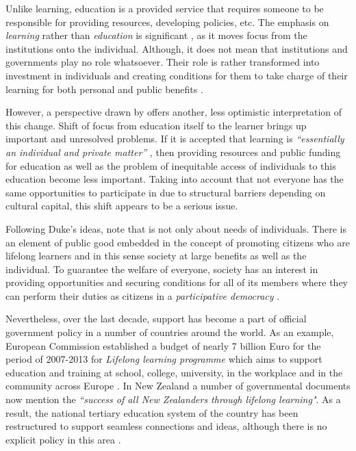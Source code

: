 Unlike learning, education is a provided service \citep{Boshier2000} that
requires someone to be responsible for providing resources, developing policies,
etc. The emphasis on \textit{learning} rather than \textit{education} is
significant \citep{Tuijnman2002}, as it moves focus from the institutions onto
the individual. Although, it does not mean that institutions and governments
play no role whatsoever. Their role is rather transformed into investment in
individuals and creating conditions for them to take charge of their learning
for both personal and public benefits \citep{Chen2009}.

However, a perspective drawn by \citet{Duke2001} offers another, less optimistic
interpretation of this change. Shift of focus from education itself to the
learner brings up important and unresolved problems. If it is accepted that
learning is \textit{``essentially an individual and private matter''}
\citep[p.~508]{Duke2001}, then providing resources and public funding for
education as well as the problem of inequitable access of individuals to this
education become less important. Taking into account that not everyone has the
same opportunities to participate in \LLLs due to structural barriers depending
on cultural capital, this shift appears to be a serious issue.

Following Duke's ideas, \citet{Aspin2001} note that \LLLs is not only about
needs of individuals. There is an element of public good embedded in the concept
of promoting citizens who are lifelong learners and in this sense society at
large benefits as well as the individual. To guarantee the welfare of everyone,
society has an interest in providing opportunities and securing conditions for
all of its members where they can perform their duties as citizens in a
\textit{participative democracy} \citep{Aspin2001}.

Nevertheless, over the last decade, \LLLs support has become a part of official
government policy in a number of countries around the world. As an example,
European Commission established a budget of nearly 7 billion Euro for the period
of 2007-2013 for \textit{Lifelong learning programme} which aims to support
education and training at school, college, university, in the workplace and in the
community across Europe \citep{TheEducation2009}. In New Zealand a number of
governmental documents \citep{NewZealandMinistryofEducation2008} now mention the
\textit{``success of all New Zealanders through lifelong learning"}. As a
result, the national tertiary education system of the country has been
restructured to support seamless connections and \LLLs ideas, although there is
no explicit policy in this area \citep{Benseman2006}.

